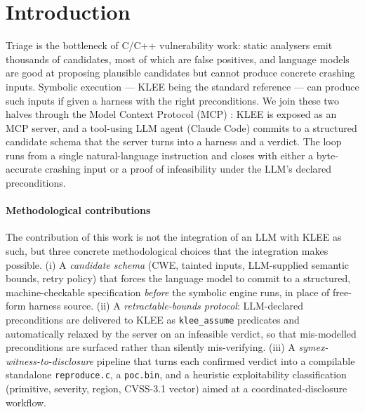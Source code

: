 \documentclass[3p,times,procedia]{elsarticle}
\begin{document}
\section{Introduction}
\label{sec:intro}

Triage is the bottleneck of C/C++ vulnerability work: static analysers emit thousands of candidates, most of which are false positives, and language models are good at proposing plausible candidates but cannot produce concrete crashing inputs. Symbolic execution --- KLEE \cite{klee} being the standard reference --- can produce such inputs if given a harness with the right preconditions. We join these two halves through the Model Context Protocol (MCP) \cite{mcp}: KLEE is exposed as an MCP server, and a tool-using LLM agent (Claude Code) commits to a structured candidate schema that the server turns into a harness and a verdict. The loop runs from a single natural-language instruction and closes with either a byte-accurate crashing input or a proof of infeasibility under the LLM's declared preconditions.

\paragraph{Methodological contributions} The contribution of this work is not the integration of an LLM with KLEE as such, but three concrete methodological choices that the integration makes possible. (i) A \emph{candidate schema} (CWE, tainted inputs, LLM-supplied semantic bounds, retry policy) that forces the language model to commit to a structured, machine-checkable specification \emph{before} the symbolic engine runs, in place of free-form harness source. (ii) A \emph{retractable-bounds protocol}: LLM-declared preconditions are delivered to KLEE as \texttt{klee\_assume} predicates and automatically relaxed by the server on an infeasible verdict, so that mis-modelled preconditions are surfaced rather than silently mis-verifying. (iii) A \emph{symex-witness-to-disclosure} pipeline that turns each confirmed verdict into a compilable standalone \texttt{reproduce.c}, a \texttt{poc.bin}, and a heuristic exploitability classification (primitive, severity, region, CVSS-3.1 vector) aimed at a coordinated-disclosure workflow.
\end{document}
